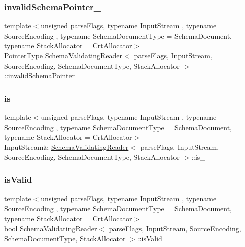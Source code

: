 \subsubsection{\texorpdfstring{invalid\+Schema\+Pointer\+\_\+}{invalidSchemaPointer\_}}
{\footnotesize\ttfamily template$<$unsigned parse\+Flags, typename Input\+Stream , typename Source\+Encoding , typename Schema\+Document\+Type  = Schema\+Document, typename Stack\+Allocator  = Crt\+Allocator$>$ \\
\hyperlink{classSchemaValidatingReader_a30ecf1b20ca5a1b79e0d5f4ceb3bf198}{Pointer\+Type} \hyperlink{classSchemaValidatingReader}{Schema\+Validating\+Reader}$<$ parse\+Flags, Input\+Stream, Source\+Encoding, Schema\+Document\+Type, Stack\+Allocator $>$\+::invalid\+Schema\+Pointer\+\_\+\hspace{0.3cm}{\ttfamily [private]}}

\mbox{\label{classSchemaValidatingReader_afef08820b573230fb30ffae3b084807f}} 
\subsubsection{\texorpdfstring{is\+\_\+}{is\_}}
{\footnotesize\ttfamily template$<$unsigned parse\+Flags, typename Input\+Stream , typename Source\+Encoding , typename Schema\+Document\+Type  = Schema\+Document, typename Stack\+Allocator  = Crt\+Allocator$>$ \\
Input\+Stream\& \hyperlink{classSchemaValidatingReader}{Schema\+Validating\+Reader}$<$ parse\+Flags, Input\+Stream, Source\+Encoding, Schema\+Document\+Type, Stack\+Allocator $>$\+::is\+\_\+\hspace{0.3cm}{\ttfamily [private]}}

\mbox{\label{classSchemaValidatingReader_a4e0dcf24425a3ac3954ac08bb5f9823c}} 
\subsubsection{\texorpdfstring{is\+Valid\+\_\+}{isValid\_}}
{\footnotesize\ttfamily template$<$unsigned parse\+Flags, typename Input\+Stream , typename Source\+Encoding , typename Schema\+Document\+Type  = Schema\+Document, typename Stack\+Allocator  = Crt\+Allocator$>$ \\
bool \hyperlink{classSchemaValidatingReader}{Schema\+Validating\+Reader}$<$ parse\+Flags, Input\+Stream, Source\+Encoding, Schema\+Document\+Type, Stack\+Allocator $>$\+::is\+Valid\+\_\+\hspace{0.3cm}{\ttfamily [private]}}

